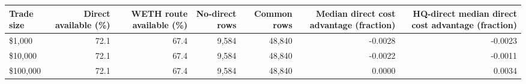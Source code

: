 \begin{tabular}{lrrrrrr}
\toprule
Trade size & Direct available (\%) & WETH route available (\%) & No-direct rows & Common rows & Median direct cost advantage (fraction) & HQ-direct median direct cost advantage (fraction) \\
\midrule
\$1,000 & 72.1 & 67.4 & 9,584 & 48,840 & -0.0028 & -0.0023 \\
\$10,000 & 72.1 & 67.4 & 9,584 & 48,840 & -0.0022 & -0.0011 \\
\$100,000 & 72.1 & 67.4 & 9,584 & 48,840 & 0.0000 & 0.0034 \\
\bottomrule
\end{tabular}
